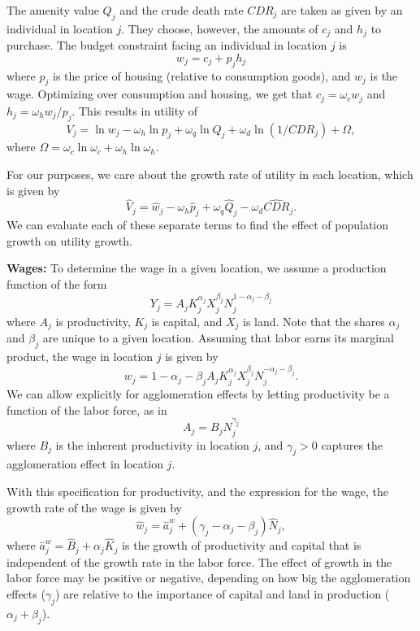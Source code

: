 \documentclass[10pt]{article}
\begin{document}
The amenity value $Q_j$ and the crude death rate $CDR_j$ are taken as given by an individual in location $j$. They choose, however, the amounts of $c_j$ and $h_j$ to purchase.  The budget constraint facing an individual in location $j$ is
\begin{equation}
    w_j = c_j + p_j h_j
\end{equation}
where $p_j$ is the price of housing (relative to consumption goods), and $w_j$ is the wage. Optimizing over consumption and housing, we get that $c_j = \omega_c w_j$ and $h_j = \omega_h w_j/p_j$. This results in utility of
\begin{equation}
    V_j = \ln w_j - \omega_h \ln p_j + \omega_q \ln Q_j + \omega_d \ln (1/CDR_j) + \Omega,
\end{equation}
where $\Omega = \omega_c \ln \omega_c + \omega_h \ln \omega_h$. 

For our purposes, we care about the growth rate of utility in each location, which is given by
\begin{equation}
    \hat{V}_j = \hat{w}_j - \omega_h \hat{p}_j + \omega_q \hat{Q}_j - \omega_d \hat{CDR}_j.
\end{equation}
We can evaluate each of these separate terms to find the effect of population growth on utility growth.

\textbf{Wages:} To determine the wage in a given location, we assume a production function of the form
\begin{equation}
    Y_j = A_j K_j^{\alpha_j} X_j^{\beta_j} N_j^{1 - \alpha_j - \beta_j}
\end{equation}
where $A_j$ is productivity, $K_j$ is capital, and $X_j$ is land. Note that the shares $\alpha_j$ and $\beta_j$ are unique to a given location. Assuming that labor earns its marginal product, the wage in location $j$ is given by
\begin{equation}
    w_j = {1 - \alpha_j - \beta_j} A_j K_j^{\alpha_j} X_j^{\beta_j} N_j^{- \alpha_j - \beta_j}.
\end{equation}
We can allow explicitly for agglomeration effects by letting productivity be a function of the labor force, as in
\begin{equation}
    A_j = B_j N_j^{\gamma_j}
\end{equation}
where $B_j$ is the inherent productivity in location $j$, and $\gamma_j>0$ captures the agglomeration effect in location $j$. 

With this specification for productivity, and the expression for the wage, the growth rate of the wage is given by
\begin{equation}
    \hat{w}_j = \hat{a}^w_j + (\gamma_j - \alpha_j - \beta_j)\hat{N}_j,
\end{equation}
where $\hat{a}^w_j = \hat{B}_j + \alpha_j \hat{K}_j$ is the growth of productivity and capital that is independent of the growth rate in the labor force. The effect of growth in the labor force may be positive or negative, depending on how big the agglomeration effects ($\gamma_j$) are relative to the importance of capital and land in production ($\alpha_j + \beta_j$).
\end{document}
